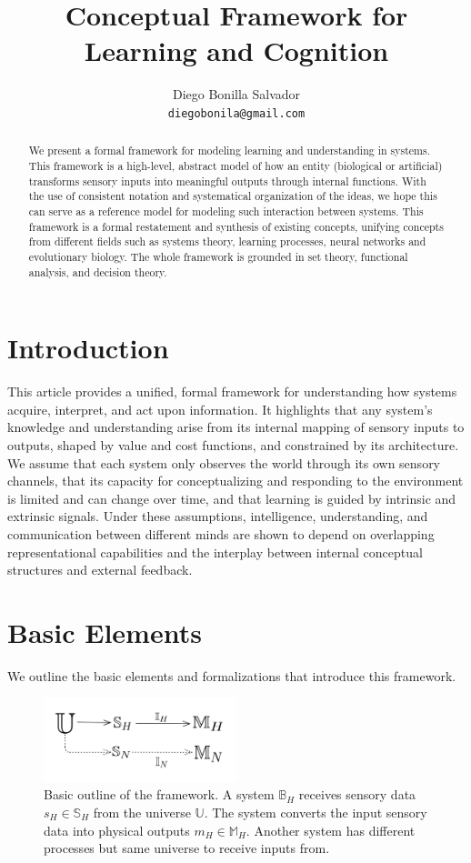 \documentclass[]{article}
\title{Conceptual Framework for Learning and Cognition}
\author{Diego Bonilla Salvador\\
\texttt{diegobonila@gmail.com}}
\begin{document}
\maketitle

\begin{abstract}
We present a formal framework for modeling learning and understanding in systems. This framework is a high-level, abstract model of how an entity (biological or artificial) transforms sensory inputs into meaningful outputs through internal functions. With the use of consistent notation and systematical organization of the ideas, we hope this can serve as a reference model for modeling such interaction between systems. This framework is a formal restatement and synthesis of existing concepts, unifying concepts from different fields such as systems theory, learning processes, neural networks and evolutionary biology. The whole framework is grounded in set theory, functional analysis, and decision theory.
\end{abstract}

\section{Introduction}
This article provides a unified, formal framework for understanding how systems acquire, interpret, and act upon information. It highlights that any system’s knowledge and understanding arise from its internal mapping of sensory inputs to outputs, shaped by value and cost functions, and constrained by its architecture. We assume that each system only observes the world through its own sensory channels, that its capacity for conceptualizing and responding to the environment is limited and can change over time, and that learning is guided by intrinsic and extrinsic signals. Under these assumptions, intelligence, understanding, and communication between different minds are shown to depend on overlapping representational capabilities and the interplay between internal conceptual structures and external feedback.

\section{Basic Elements}

We outline the basic elements and formalizations that introduce this framework.

\begin{figure}[h]
	\centering
	\includegraphics[width=0.5\textwidth]{basic}
	\caption{Basic outline of the framework. A system $\mathbb{B}_H$ receives sensory data $s_H \in \mathbb{S}_H$ from the universe $\mathbb{U}$. The system converts the input sensory data into physical outputs $m_H \in \mathbb{M}_H$. Another system has different processes but same universe to receive inputs from.}
	\label{fig:fig1}
\end{figure}
\end{document}
